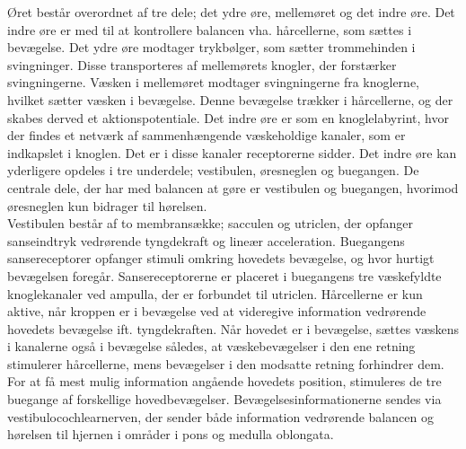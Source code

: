 Øret består overordnet af tre dele; det ydre øre, mellemøret og det indre øre. Det indre øre er med til at kontrollere balancen vha. hårcellerne, som sættes i bevægelse. Det ydre øre modtager trykbølger, som sætter trommehinden i svingninger. Disse transporteres af mellemørets knogler, der forstærker svingningerne. Væsken i mellemøret modtager svingningerne fra knoglerne, hvilket sætter væsken i bevægelse. Denne bevægelse trækker i hårcellerne, og der skabes derved et aktionspotentiale. Det indre øre er som en knoglelabyrint, hvor der findes et netværk af sammenhængende væskeholdige kanaler, som er indkapslet i knoglen. Det er i disse kanaler receptorerne sidder. 
Det indre øre kan yderligere opdeles i tre underdele; vestibulen, øresneglen og buegangen. De centrale dele, der har med balancen at gøre er vestibulen og buegangen, hvorimod øresneglen kun bidrager til hørelsen.\cite{Martini2012}    
\\
Vestibulen består af to membransække; sacculen og utriclen, der opfanger sanseindtryk vedrørende tyngdekraft og lineær acceleration. Buegangens sansereceptorer opfanger stimuli omkring hovedets bevægelse, og hvor hurtigt bevægelsen foregår. Sansereceptorerne er placeret i buegangens tre væskefyldte knoglekanaler ved ampulla, der er forbundet til utriclen. Hårcellerne er kun aktive, når kroppen er i bevægelse ved at videregive information vedrørende hovedets bevægelse ift. tyngdekraften. Når hovedet er i bevægelse, sættes væskens i kanalerne også i bevægelse således, at væskebevægelser i den ene retning stimulerer hårcellerne, mens bevægelser i den modsatte retning forhindrer dem. For at få mest mulig information angående hovedets position, stimuleres de tre buegange af forskellige hovedbevægelser. Bevægelsesinformationerne sendes via vestibulocochlearnerven, der sender både information vedrørende balancen og hørelsen til hjernen i områder i pons og medulla oblongata. \cite{Martini2012}    



